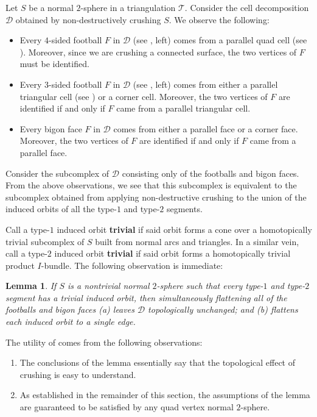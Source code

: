 \documentclass[10pt,a4paper]{amsart}
\newtheorem{lemma}[theorem]{Lemma}
\newcommand{\tri}{\mathcal{T}}
\begin{document}
Let $S$ be a normal $2$-sphere in a triangulation $\tri$. Consider the cell decomposition $\mathcal{D}$ obtained by non-destructively crushing $S$. We observe the following:
\begin{itemize}
\item Every $4$-sided football $F$ in $\mathcal{D}$ (see , left) comes from a parallel quad cell
(see ).
Moreover, since we are crushing a connected surface, the two vertices of $F$ must be identified.

\item Every $3$-sided football $F$ in $\mathcal{D}$ (see , left) comes from either
a parallel triangular cell (see ) or a corner cell. Moreover, the two vertices of $F$ are identified if and only if $F$ came from a parallel triangular cell.

\item Every bigon face $F$ in $\mathcal{D}$ comes from either a parallel face or a corner face.
Moreover, the two vertices of $F$ are identified if and only if $F$ came from a parallel face.


\end{itemize}
Consider the subcomplex of $\mathcal{D}$ consisting only of the footballs and bigon faces.
From the above observations, we see that this subcomplex is equivalent to the subcomplex obtained from
applying non-destructive crushing to the union of the induced orbits of all the type-$1$ and type-$2$ segments.

Call a type-$1$ induced orbit \textbf{trivial} if said orbit forms a cone over a
homotopically trivial subcomplex of $S$ built from normal arcs and triangles.
In a similar vein, call a type-$2$ induced orbit \textbf{trivial} if said orbit forms a homotopically trivial product $I$-bundle.
The following observation is immediate:

\begin{lemma}\label{lem:flattenToEdge}
If $S$ is a nontrivial normal $2$-sphere such that every type-$1$ and type-$2$ segment has a trivial induced orbit, then
simultaneously flattening all of the footballs and bigon faces {\em (a)} leaves $\mathcal{D}$ topologically unchanged; and {\em (b)} flattens each induced orbit to a single edge.
\end{lemma}

The utility of  comes from the following observations:
\begin{enumerate}
\item The conclusions of the lemma essentially say that the topological effect of crushing is easy to understand.
\item As established in the remainder of this section, the assumptions of the lemma are guaranteed to be satisfied by any quad vertex normal $2$-sphere.
\end{enumerate}
\end{document}

